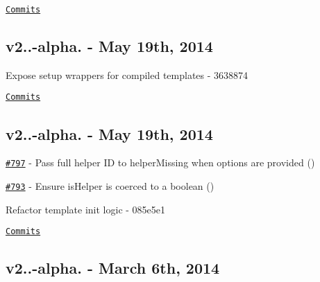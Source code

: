 \href{https://github.com/wycats/handlebars.js/compare/v2.0.0-alpha.4...v2.0.0-beta.1}{\tt Commits}

\subsection*{v2..-\/alpha. -\/ May 19th, 2014}


\begin{DoxyItemize}
\item Expose setup wrappers for compiled templates -\/ 3638874
\end{DoxyItemize}

\href{https://github.com/wycats/handlebars.js/compare/v2.0.0-alpha.3...v2.0.0-alpha.4}{\tt Commits}

\subsection*{v2..-\/alpha. -\/ May 19th, 2014}


\begin{DoxyItemize}
\item \href{https://github.com/wycats/handlebars.js/pull/797}{\tt \#797} -\/ Pass full helper ID to helper\+Missing when options are provided (\href{https://api.github.com/users/tomdale}{\tt })
\item \href{https://github.com/wycats/handlebars.js/pull/793}{\tt \#793} -\/ Ensure is\+Helper is coerced to a boolean (\href{https://api.github.com/users/mmun}{\tt })
\item Refactor template init logic -\/ 085e5e1
\end{DoxyItemize}

\href{https://github.com/wycats/handlebars.js/compare/v2.0.0-alpha.2...v2.0.0-alpha.3}{\tt Commits}

\subsection*{v2..-\/alpha. -\/ March 6th, 2014}


